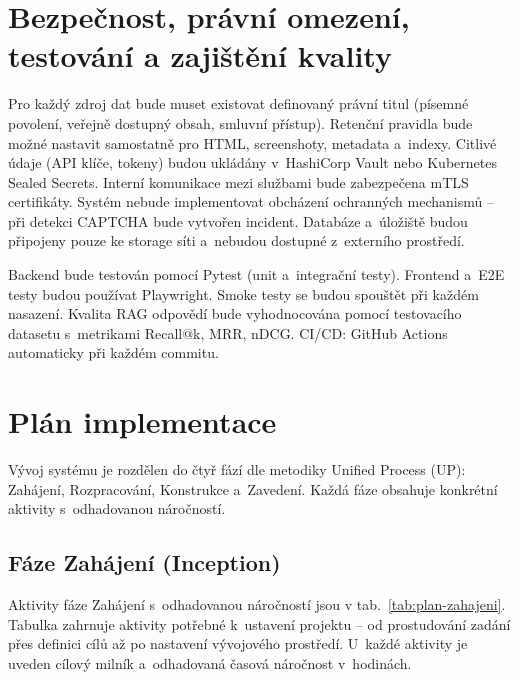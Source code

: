 \documentclass[a4paper, 11pt]{article}
\begin{document}
\newpage
\section{Bezpečnost, právní omezení, testování a zajištění kvality}

Pro každý zdroj dat bude muset existovat definovaný právní titul (písemné povolení, veřejně dostupný obsah, smluvní přístup). Retenční pravidla bude možné nastavit samostatně pro HTML, screenshoty, metadata a~indexy. Citlivé údaje (API klíče, tokeny) budou ukládány v~HashiCorp Vault nebo Kubernetes Sealed Secrets. Interní komunikace mezi službami bude zabezpečena mTLS certifikáty. Systém nebude implementovat obcházení ochranných mechanismů -- při detekci CAPTCHA bude vytvořen incident. Databáze a~úložiště budou připojeny pouze ke storage síti a~nebudou dostupné z~externího prostředí.

Backend bude testován pomocí Pytest (unit a~integrační testy). Frontend a~E2E testy budou používat Playwright. Smoke testy se budou spouštět při každém nasazení. Kvalita RAG odpovědí bude vyhodnocována pomocí testovacího datasetu s~metrikami Recall@k, MRR, nDCG. CI/CD: GitHub Actions automaticky při každém commitu.

\newpage
\section{Plán implementace}

Vývoj systému je rozdělen do čtyř fází dle metodiky Unified Process (UP): Zahájení, Rozpracování, Konstrukce a~Zavedení. Každá fáze obsahuje konkrétní aktivity s~odhadovanou náročností.

\subsection{Fáze Zahájení (Inception)}

Aktivity fáze Zahájení s~odhadovanou náročností jsou v tab.~\ref{tab:plan-zahajeni}.
Tabulka zahrnuje aktivity potřebné k~ustavení projektu -- od prostudování zadání přes definici cílů až po nastavení vývojového prostředí. U~každé aktivity je uveden cílový milník a~odhadovaná časová náročnost v~hodinách.
\end{document}
